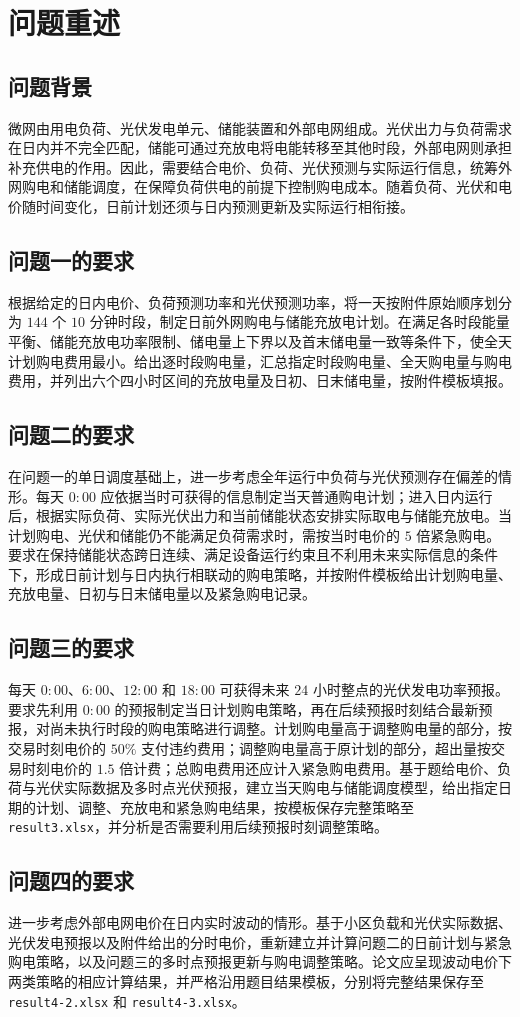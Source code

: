 \section{问题重述}

\subsection{问题背景}
微网由用电负荷、光伏发电单元、储能装置和外部电网组成。光伏出力与负荷需求在日内并不完全匹配，储能可通过充放电将电能转移至其他时段，外部电网则承担补充供电的作用。因此，需要结合电价、负荷、光伏预测与实际运行信息，统筹外网购电和储能调度，在保障负荷供电的前提下控制购电成本。随着负荷、光伏和电价随时间变化，日前计划还须与日内预测更新及实际运行相衔接。

\subsection{问题一的要求}
根据给定的日内电价、负荷预测功率和光伏预测功率，将一天按附件原始顺序划分为 $144$ 个 $10$ 分钟时段，制定日前外网购电与储能充放电计划。在满足各时段能量平衡、储能充放电功率限制、储电量上下界以及首末储电量一致等条件下，使全天计划购电费用最小。给出逐时段购电量，汇总指定时段购电量、全天购电量与购电费用，并列出六个四小时区间的充放电量及日初、日末储电量，按附件模板填报。

\subsection{问题二的要求}
在问题一的单日调度基础上，进一步考虑全年运行中负荷与光伏预测存在偏差的情形。每天 $0{:}00$ 应依据当时可获得的信息制定当天普通购电计划；进入日内运行后，根据实际负荷、实际光伏出力和当前储能状态安排实际取电与储能充放电。当计划购电、光伏和储能仍不能满足负荷需求时，需按当时电价的 $5$ 倍紧急购电。要求在保持储能状态跨日连续、满足设备运行约束且不利用未来实际信息的条件下，形成日前计划与日内执行相联动的购电策略，并按附件模板给出计划购电量、充放电量、日初与日末储电量以及紧急购电记录。

\subsection{问题三的要求}
每天 $0{:}00$、$6{:}00$、$12{:}00$ 和 $18{:}00$ 可获得未来 $24$ 小时整点的光伏发电功率预报。要求先利用 $0{:}00$ 的预报制定当日计划购电策略，再在后续预报时刻结合最新预报，对尚未执行时段的购电策略进行调整。计划购电量高于调整购电量的部分，按交易时刻电价的 $50\%$ 支付违约费用；调整购电量高于原计划的部分，超出量按交易时刻电价的 $1.5$ 倍计费；总购电费用还应计入紧急购电费用。基于题给电价、负荷与光伏实际数据及多时点光伏预报，建立当天购电与储能调度模型，给出指定日期的计划、调整、充放电和紧急购电结果，按模板保存完整策略至 \texttt{result3.xlsx}，并分析是否需要利用后续预报时刻调整策略。

\subsection{问题四的要求}
进一步考虑外部电网电价在日内实时波动的情形。基于小区负载和光伏实际数据、光伏发电预报以及附件给出的分时电价，重新建立并计算问题二的日前计划与紧急购电策略，以及问题三的多时点预报更新与购电调整策略。论文应呈现波动电价下两类策略的相应计算结果，并严格沿用题目结果模板，分别将完整结果保存至 \texttt{result4-2.xlsx} 和 \texttt{result4-3.xlsx}。
